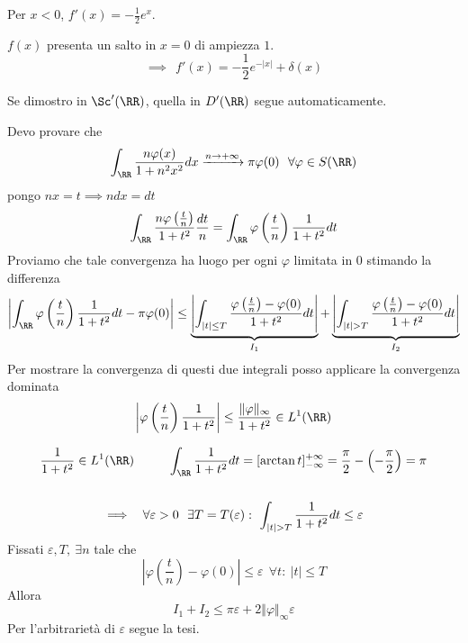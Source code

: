 Per $x < 0$, $f'(x) = - \frac{1}{2} e^{x}$.

$f(x)$ presenta un salto in $x = 0$ di ampiezza $1$.
\begin{equation*}
\implies \ \ f'(x) = - \frac{1}{2} e^{- | x|} + \delta (x)
\end{equation*}

\Soluzione


Se dimostro in $\Sc'(\RR)$, quella in $D'(\RR)$ segue automaticamente.

Devo provare che
\begin{equation*}
\int_{\RR}\frac{n\varphi (x)}{1 + n^{2} x^{2}} dx\xrightarrow{n\rightarrow + \infty} \pi \varphi (0) \ \ \forall \varphi \in S(\RR)
\end{equation*}
pongo $nx = t\implies ndx = dt$
\begin{equation*}
\int_{\RR}\frac{n\varphi \left(\frac{t}{n}\right)}{1 + t^{2}}\frac{dt}{n} = \int_{\RR} \varphi \left(\frac{t}{n}\right)\frac{1}{1 + t^{2}} dt
\end{equation*}
Proviamo che tale convergenza ha luogo per ogni $\varphi $ limitata in $0$ stimando la differenza
\begin{equation*}
\left| \int_{\RR} \varphi \left(\frac{t}{n}\right)\frac{1}{1 + t^{2}} dt - \pi \varphi (0)\right| \leq \underbrace{\left| \int_{| t| \leq T}\frac{\varphi \left(\frac{t}{n}\right) - \varphi (0)}{1 + t^{2}} dt\right|}_{I_{1}} + \underbrace{\left| \int_{| t| > T}\frac{\varphi \left(\frac{t}{n}\right) - \varphi (0)}{1 + t^{2}} dt\right|}_{I_{2}}
\end{equation*}
Per mostrare la convergenza di questi due integrali posso applicare la convergenza dominata
\begin{equation*}
\left| \varphi \left(\frac{t}{n}\right)\frac{1}{1 + t^{2}}\right| \leq \frac{\Vert \varphi \Vert_{\infty}}{1 + t^{2}} \in L^{1}(\RR)
\end{equation*}
\begin{rem}
\begin{gather*}
\frac{1}{1 + t^{2}} \in L^{1}(\RR) \ \ \ \ \ \ \ \ \int_{\RR}\frac{1}{1 + t^{2}} dt = [\arctan t]^{+ \infty}_{- \infty} = \frac{\pi}{2} - \left(- \frac{\pi}{2}\right) = \pi \\
\\
\implies \ \ \forall \varepsilon > 0\ \ \exists T = T(\varepsilon) :\ \int_{| t| > T}\frac{1}{1 + t^{2}} dt \leq \varepsilon
\end{gather*}
Fissati $\varepsilon, T, \ \exists n$ tale che
\begin{equation*}
\left| \varphi \left(\frac{t}{n}\right) - \varphi (0)\right| \leq \varepsilon \ \ \forall t:\ | t| \leq T
\end{equation*}
Allora
\begin{equation*}
I_{1} + I_{2} \leq \pi \varepsilon + 2\Vert \varphi \Vert_{\infty} \varepsilon
\end{equation*}
Per l'arbitrarietà di $\varepsilon $ segue la tesi.
\end{rem}

